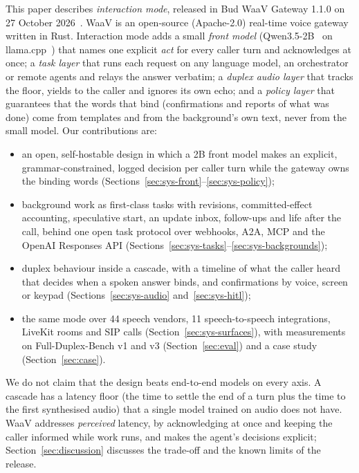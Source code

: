 This paper describes \emph{interaction mode}, released in Bud WaaV Gateway 1.1.0 on 27 October
2026~\citep{waav_repo,waav_imdoc}. WaaV is an open-source (Apache-2.0) real-time voice gateway written in
Rust. Interaction mode adds a small \emph{front model} (Qwen3.5-2B~\citep{qwen35_2b} on
llama.cpp~\citep{llamacpp}) that names one explicit \emph{act} for every caller turn and acknowledges at
once; a \emph{task layer} that runs each request on any language model, an orchestrator or remote agents
and relays the answer verbatim; a \emph{duplex audio layer} that tracks the floor, yields to the caller and
ignores its own echo; and a \emph{policy layer} that guarantees that the words that bind (confirmations and
reports of what was done) come from templates and from the background's own text, never from the small
model. Our contributions are:
\begin{itemize}
  \item an open, self-hostable design in which a 2B front model makes an explicit, grammar-constrained,
    logged decision per caller turn while the gateway owns the binding words
    (Sections~\ref{sec:sys-front}--\ref{sec:sys-policy});
  \item background work as first-class tasks with revisions, committed-effect accounting, speculative
    start, an update inbox, follow-ups and life after the call, behind one open task protocol over
    webhooks, A2A, MCP and the OpenAI Responses API (Sections~\ref{sec:sys-tasks}--\ref{sec:sys-backgrounds});
  \item duplex behaviour inside a cascade, with a timeline of what the caller heard that decides when a
    spoken answer binds, and confirmations by voice, screen or keypad (Sections~\ref{sec:sys-audio}
    and~\ref{sec:sys-hitl});
  \item the same mode over 44 speech vendors, 11 speech-to-speech integrations, LiveKit rooms and SIP calls
    (Section~\ref{sec:sys-surfaces}), with measurements on Full-Duplex-Bench v1 and v3
    (Section~\ref{sec:eval}) and a case study (Section~\ref{sec:case}).
\end{itemize}
We do not claim that the design beats end-to-end models on every axis. A cascade has a latency floor
(the time to settle the end of a turn plus the time to the first synthesised audio) that a single model
trained on audio does not have. WaaV addresses \emph{perceived} latency, by acknowledging at once and
keeping the caller informed while work runs, and makes the agent's decisions explicit;
Section~\ref{sec:discussion} discusses the trade-off and the known limits of the release.
